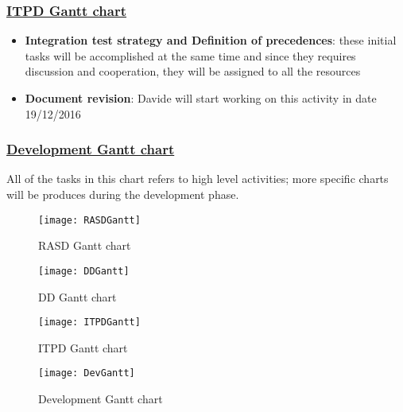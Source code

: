 \subsubsection{\hyperref[fig:itpdGantt]{ITPD Gantt chart}}
\begin{itemize}
	\item \textbf{Integration test strategy and Definition of precedences}: these initial tasks will be accomplished at the same time and since they requires discussion and cooperation, they will be assigned to all the resources
	\item \textbf{Document revision}: Davide will start working on this activity in date 19/12/2016
\end{itemize}

\subsubsection{\hyperref[fig:devGantt]{Development Gantt chart}}
All of the tasks in this chart refers to high level activities; more specific charts will be produces during the development phase.

\begin{figure}[h]
	\centering
	\texttt{[image: RASDGantt]}	\caption{
		\label{fig:rasdGantt} 
		RASD Gantt chart
	}
\end{figure}

\begin{figure}[h]
	\centering
	\texttt{[image: DDGantt]}	\caption{
		\label{fig:ddGantt} 
		DD Gantt chart
	}
\end{figure}

\begin{figure}[h]
	\centering
	\texttt{[image: ITPDGantt]}	\caption{
		\label{fig:itpdGantt} 
		ITPD Gantt chart
	}
\end{figure}

\begin{figure}[h]
	\centering
	\texttt{[image: DevGantt]}	\caption{
		\label{fig:devGantt} 
		Development Gantt chart
	}
\end{figure}

\clearpage
